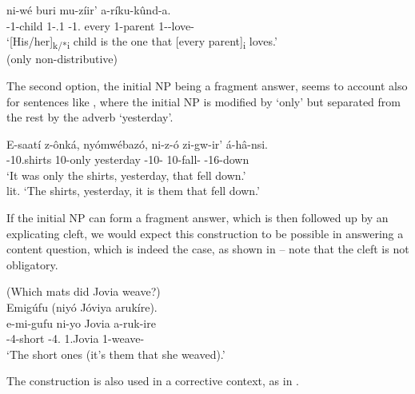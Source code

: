 \documentclass[output=paper]{langscibook}
\begin{document}
\ea
\label{bkm:Ref98948563}
\gll
[O-mw-ana  wé]  ni-wé   buri   mu-zíir’   a-ríku-kûnd-a.\\
\AUG{}-1-child  1-\POSS{}.1  \COP{}-1.\PRO{}  every  1-parent  1\SM{}-\IPFV{}-love-\FV{}\\
\glt
‘[His/her]\textsubscript{k/*i} child is the one that [every parent]\textsubscript{i} loves.’\\
(only non-distributive)


\z


The second option, the initial NP being a fragment answer, seems to account also for sentences like , where the initial NP is modified by ‘only’ but separated from the rest by the adverb ‘yesterday’.

\ea
\label{bkm:Ref98948713}
\gll
E-saatí  z-ônká,  nyómwébazó,  ni-z-ó     zi-gw-ir’  á-hâ-nsi. \\
\AUG{}-10.shirts   10-only  yesterday   \COP{}-10-\PRO{}     10\SM{}-fall-\PFV{}  \AUG{}-16-down \\
    \glt ‘It was only the shirts, yesterday, that fell down.’\\
lit. `The shirts, yesterday, it is them that fell down.'\\

\z

If the initial NP can form a fragment answer, which is then followed up by an explicating cleft, we would expect this construction to be possible in answering a content question, which is indeed the case, as shown in  – note that the cleft is not obligatory.

\ea
\label{bkm:Ref98949372}
(Which mats did Jovia weave?)\\
Emigúfu (niyó Jóviya arukíre).\\
\gll
e-mi-gufu  ni-yo  Jovia  a-ruk-ire\\
\AUG{}-4-short  \COP{}-4.\PRO{}  1.Jovia  1\SM{}-weave-\PFV{}\\
\glt
‘The short ones (it’s them that she weaved).’\\


\z


The construction is also used in a corrective context, as in .
\end{document}
